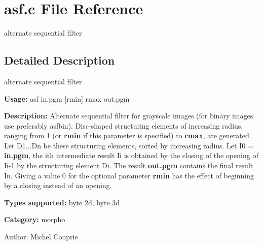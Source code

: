 \section{asf.c File Reference}
\label{asf_8c}
alternate sequential filter  




\label{_details}
\subsection{Detailed Description}
alternate sequential filter 

{\bf Usage:} asf in.pgm [rmin] rmax out.pgm

{\bf Description:} Alternate sequential filter for grayscale images (for binary images use preferably asfbin). Disc-shaped structuring elements of increasing radius, ranging from 1 (or {\bf rmin} if this parameter is specified) to {\bf rmax}, are generated. Let D1...Dn be these structuring elements, sorted by increasing radius. Let I0 = {\bf in.pgm}, the ith intermediate result Ii is obtained by the closing of the opening of Ii-1 by the structuring element Di. The result {\bf out.pgm} contains the final result In. Giving a value 0 for the optional parameter {\bf rmin} has the effect of beginning by a closing instead of an opening.

{\bf Types supported:} byte 2d, byte 3d

{\bf Category:} morpho

\begin{Desc}
\item[Author:]Michel Couprie \end{Desc}

